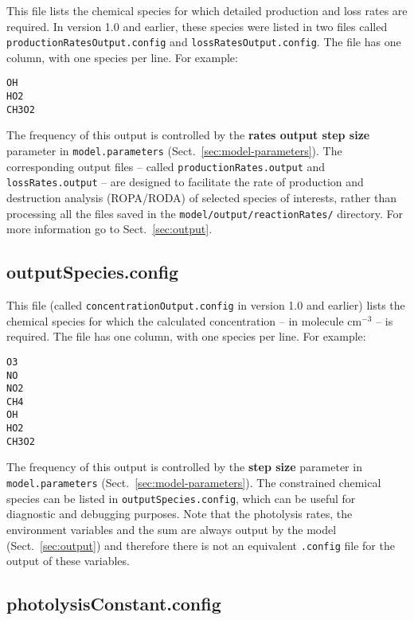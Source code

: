 This file lists the chemical species for which detailed production and
loss rates are required. In version 1.0 and earlier, these species
were listed in two files called \texttt{productionRatesOutput.config}
and \texttt{lossRatesOutput.config}. The file has one column, with one
species per line. For example:

\begin{verbatim}
OH
HO2
CH3O2
\end{verbatim}

The frequency of this output is controlled by the \textbf{rates output
  step size} parameter in \texttt{model.parameters}
(Sect.~\ref{sec:model-parameters}). The corresponding output files --
called \texttt{productionRates.output} and \texttt{lossRates.output}
-- are designed to facilitate the rate of production and destruction
analysis (ROPA/RODA) of selected species of interests, rather than
processing all the files saved in the \texttt{model/output/reactionRates/}
directory. For more information go to Sect.~\ref{sec:output}.

\subsection{outputSpecies.config} \label{subsec:outputspecies}

This file (called \texttt{concentrationOutput.config} in version 1.0
and earlier) lists the chemical species for which the calculated
concentration -- in molecule cm$^{-3}$ -- is required. The file has
one column, with one species per line. For example:

\begin{verbatim}
O3
NO
NO2
CH4
OH
HO2
CH3O2
\end{verbatim}

The frequency of this output is controlled by the \textbf{step size}
parameter in \texttt{model.parameters} (Sect.~\ref{sec:model-parameters}).
The constrained chemical species can be listed in
\texttt{outputSpecies.config}, which can be useful for diagnostic and
debugging purposes. Note that the photolysis rates, the environment
variables and the  sum are always output by the model
(Sect.~\ref{sec:output}) and therefore there is not an equivalent
\texttt{.config} file for the output of these variables.

\subsection{photolysisConstant.config} \label{subsec:photolysisconstant}

